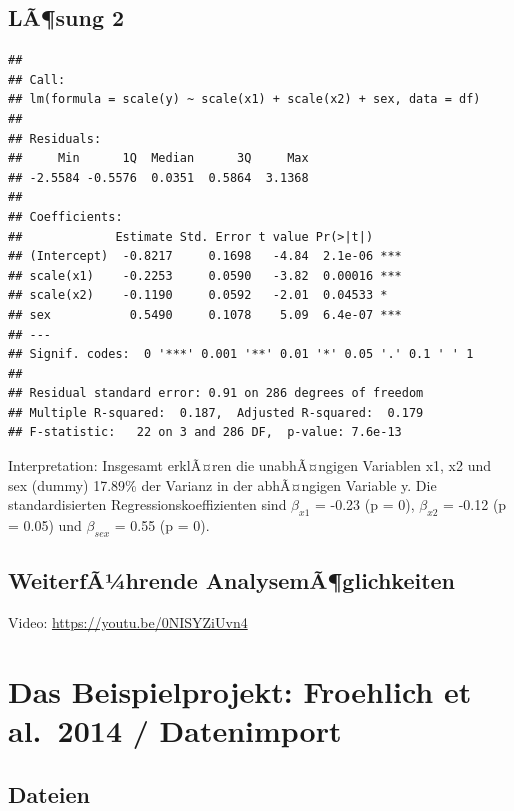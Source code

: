 \documentclass[
]{book}
\begin{document}
\hypertarget{luxe3sung-2}{%
\section{LÃ¶sung 2}\label{luxe3sung-2}}

\begin{verbatim}
## 
## Call:
## lm(formula = scale(y) ~ scale(x1) + scale(x2) + sex, data = df)
## 
## Residuals:
##     Min      1Q  Median      3Q     Max 
## -2.5584 -0.5576  0.0351  0.5864  3.1368 
## 
## Coefficients:
##             Estimate Std. Error t value Pr(>|t|)    
## (Intercept)  -0.8217     0.1698   -4.84  2.1e-06 ***
## scale(x1)    -0.2253     0.0590   -3.82  0.00016 ***
## scale(x2)    -0.1190     0.0592   -2.01  0.04533 *  
## sex           0.5490     0.1078    5.09  6.4e-07 ***
## ---
## Signif. codes:  0 '***' 0.001 '**' 0.01 '*' 0.05 '.' 0.1 ' ' 1
## 
## Residual standard error: 0.91 on 286 degrees of freedom
## Multiple R-squared:  0.187,  Adjusted R-squared:  0.179 
## F-statistic:   22 on 3 and 286 DF,  p-value: 7.6e-13
\end{verbatim}

Interpretation: Insgesamt erklÃ¤ren die unabhÃ¤ngigen Variablen x1, x2 und sex (dummy) 17.89\% der Varianz in der abhÃ¤ngigen Variable y. Die standardisierten Regressionskoeffizienten sind \(\beta_{x1}\) = -0.23 (p = 0), \(\beta_{x2}\) = -0.12 (p = 0.05) und \(\beta_{sex}\) = 0.55 (p = 0).

\hypertarget{weiterfuxe3uxbchrende-analysemuxe3glichkeiten}{%
\section{WeiterfÃ¼hrende AnalysemÃ¶glichkeiten}\label{weiterfuxe3uxbchrende-analysemuxe3glichkeiten}}

Video: \url{https://youtu.be/0NISYZiUvn4}

\hypertarget{das-beispielprojekt-froehlich-et-al.-2014-datenimport}{%
\chapter{Das Beispielprojekt: Froehlich et al.~2014 / Datenimport}\label{das-beispielprojekt-froehlich-et-al.-2014-datenimport}}

\hypertarget{dateien}{%
\section{Dateien}\label{dateien}}
\end{document}

